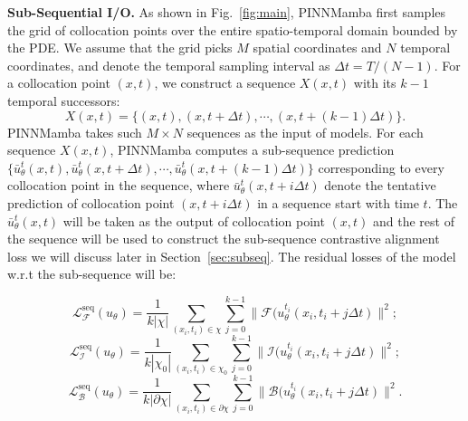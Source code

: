 \documentclass{article}
\theoremstyle{plain}
\theoremstyle{definition}
\theoremstyle{remark}
\begin{document}
\textbf{Sub-Sequential I/O.} As shown in Fig.~\ref{fig:main}, PINNMamba first samples the grid of collocation points over the entire spatio-temporal domain bounded by the PDE. We assume that the grid picks $M$ spatial coordinates and $N$ temporal coordinates, and denote the temporal sampling interval as $\Delta t = T/(N-1)$. For a collocation point $(x,t)$, we construct a sequence $X(x,t)$ with its $k-1$ temporal successors:  
\begin{equation}
    X(x,t) = \{(x,t),(x,t+\Delta t),\cdots,(x,t+(k-1)\Delta t)\}.
\end{equation}
PINNMamba takes such $M\times N$ sequences as the input of models. 
    For each sequence $X(x,t)$, PINNMamba computes a sub-sequence prediction $\{\bar u_\theta^t (x,t),\bar u_\theta^t (x,t+\Delta t),\cdots,\bar u_\theta^t (x,t+(k-1)\Delta t)\}$ corresponding to every collocation point in the sequence, where $\bar u_\theta^t (x,t+i\Delta t)$ denote the tentative prediction of collocation point $(x,t+i\Delta t)$ in a sequence start with time $t$. The $\bar u_\theta^t (x,t)$ will be taken as the output of collocation point $(x,t)$ and the rest of the sequence will be used to construct the sub-sequence contrastive alignment loss we will discuss later in Section~\ref{sec:subseq}. The residual losses of the model w.r.t the sub-sequence will be:
    
\vspace{-5mm}

    \small{
    \begin{equation}
    \mathcal L_{\mathcal F}^\text{seq}(u_\theta)= \frac{1}{k|\chi|}\sum_{(x_i,t_i)\in \chi}\sum_{j=0}^{k-1}\|\mathcal F(u_\theta^{t_i}(x_i,t_i+j\Delta t)\|^2;
    \label{equ:lossequseq}
\end{equation}
\begin{equation}
    \mathcal L_{\mathcal I}^\text{seq}(u_\theta)= \frac{1}{k|\chi_0|}\sum_{(x_i,t_i)\in \chi_0}\sum_{j=0}^{k-1}\|\mathcal I(u_\theta^{t_i}(x_i,t_i+j\Delta t)\|^2;
    \label{equ:lossinitseq}
\end{equation}
\begin{equation}
    \mathcal L_{\mathcal B}^\text{seq}(u_\theta)= \frac{1}{k|\partial\chi|}\sum_{(x_i,t_i)\in \partial\chi}\sum_{j=0}^{k-1}\|\mathcal B(u_\theta^{t_i}(x_i,t_i+j\Delta t)\|^2.
    \label{equ:lossboundseq}
\end{equation}
}
\normalsize
\vspace{-5mm}
\end{document}
